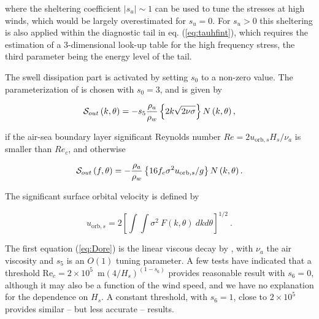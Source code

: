 \noindent
where the sheltering coefficient $\left|s_u\right|\sim 1$ can be used to tune
the stresses at high winds, which would be largely overestimated for
$s_u=0$. For $s_u > 0$ this sheltering is also applied within the diagnostic
tail in eq. (\ref{eq:tauhfint}), which requires the estimation of a
3-dimensional look-up table for the high frequency stress, the third parameter
being the energy level of the tail.

The swell dissipation part is activated by setting $s_0$ to a non-zero value.
The parameterization of \cite{art:ACC08} is chosen with $s_0=3$, and is given
by

\begin{equation}
{\cal S}_{out}\left(k,\theta\right) = - s_5 \frac{\rho_a}{\rho_w}\left\{ 2 k \sqrt{2
\nu \sigma}\right\}  N \left(k,\theta\right) \label{Sds_turb},\label{eq:Dore}
\end{equation}

\noindent
if the air-sea boundary layer significant Reynolds number $Re = 2
u_{\mathrm{orb},s} H_s / \nu_{a}$ is smaller than $Re_c$, and otherwise

\begin{equation}
{\cal S}_{out} \left(f,\theta\right) = - \frac{\rho_a}{\rho_w}\left\{  16 f_e
\sigma^2 u_{\mathrm{orb},s} / g \right\}
 N\left(k,\theta\right) \label{Sds_visc}.\label{eq:swell_turb}
\end{equation}

\noindent
The significant surface orbital velocity is defined by

\begin{equation} u_{\mathrm{orb},s} = 2 \left [  \int \!\!\!\! \int
      \sigma^2 \: F(k,\theta) \: dk d\theta \right ] ^{1/2}
      \: . \label{eq:ub_orbs} \end{equation}

\noindent
The first equation (\ref{eq:Dore}) is the linear viscous decay by
\cite{art:Dore78}, with $\nu_a$ the air viscosity and $s_5$ is an $O(1)$
tuning parameter. A few tests have indicated that a threshold Re$_{c}=2 \times 10^5$~m$(4/H_s)^(1-s_6)$ provides reasonable result with 
$s_6=0$, although it may also be a function of the wind speed, and we have no explanation for the dependence on $H_s$. 
A constant threshold, with $s_6=1$, close to $2 \times 10^5$ provides similar -- but less accurate -- results. 


